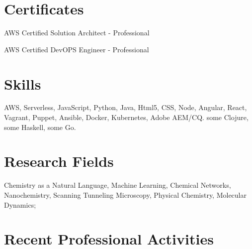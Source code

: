 \documentclass[11pt,letterpaper]{article}
\renewenvironment{itemize}{
  \begin{list}{}{
    \setlength{\leftmargin}{1.5em}
  }
}{
  \end{list}
}
\begin{document}
\section*{Certificates}
\begin{itemize}
  \item  AWS Certified Solution Architect - Professional
  \item  AWS Certified DevOPS Engineer - Professional
\end{itemize}


\section*{Skills}

\begin{itemize}
  \item  AWS, Serverless, JavaScript, Python, Java, Html5, CSS, Node, Angular, React, Vagrant, Puppet, Ansible, Docker, Kubernetes, Adobe AEM/CQ. some Clojure, some Haskell, some Go.
\end{itemize}

\section*{Research Fields}
Chemistry as a Natural Language, Machine Learning, Chemical Networks, Nanochemistry, Scanning Tunneling Microscopy, Physical Chemistry, Molecular Dynamics;


\section*{Recent Professional Activities}
\end{document}
